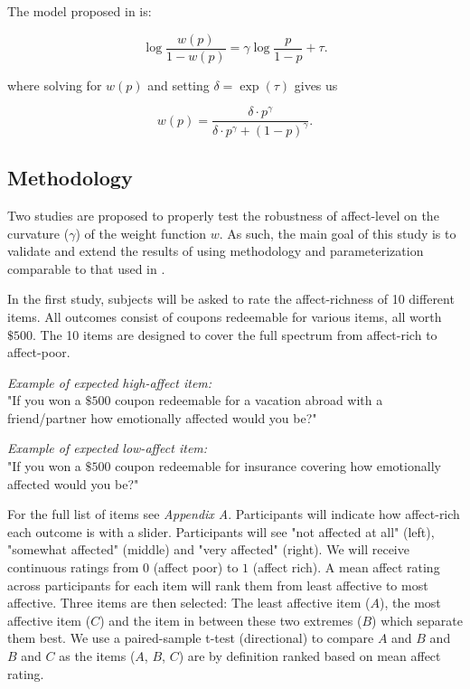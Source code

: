 \documentclass[12pt]{article}
\begin{document}
\vspace{3mm}

The model proposed in \textcite{gonzalez1999shape} is:

\[
	\log\frac{w(p)}{1-w(p)} =
	\gamma \log\frac{p}{1-p} + \tau
.\]

where solving for $w(p)$ and setting $\delta = \exp(\tau)$
gives us

\[
	w(p) = \frac{\delta \cdot p^{\gamma}}
	{\delta \cdot p^{\gamma} +
	(1-p)^{\gamma}}
.\]

\subsection{Methodology}

Two studies are proposed to
properly test the robustness
of affect-level on the
curvature ($\gamma$) of the
weight function $w$. As such, the
main goal of this study is to validate
and extend the results of
\autocite{rottenstreich2001money}
using methodology and parameterization
comparable to that used in
\autocite{gonzalez1999shape}.

\vspace{3mm}

In the first study, subjects will be asked to
rate the affect-richness of 10 different
items.
All outcomes
consist of coupons redeemable
for various items, all worth $\$500$.
The 10 items are designed to cover the
full spectrum from affect-rich to
affect-poor.

\vspace{3mm}

\emph{Example of expected high-affect item:} \\
"If you won a $\$500$ coupon redeemable
for a vacation abroad with a friend/partner
how emotionally
affected would you be?"

\vspace{3mm}

\emph{Example of expected low-affect item:} \\
"If you won a $\$500$ coupon redeemable
for insurance covering how emotionally
affected would you be?"

\vspace{3mm}

For the full list of items see \emph{Appendix A}.
Participants
will indicate how affect-rich
each outcome is with a slider. Participants will
see "not affected at all" (left),
"somewhat affected" (middle)
and "very affected" (right).
We will receive continuous ratings from $0$
(affect poor) to $1$ (affect rich). A mean
affect rating across participants for each
item will rank them from least affective to
most affective. Three items are
then selected: The least affective item ($A$),
the most affective item ($C$) and the item in
between these two extremes ($B$) which separate them
best. We use a paired-sample t-test
(directional) to compare $A$ and  $B$
and  $B$ and  $C$ as the items ($A$,  $B$,  $C$)
are by definition ranked based on mean
affect rating.
\end{document}
